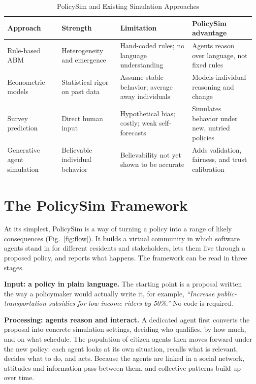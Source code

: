 \documentclass[conference]{IEEEtran}
\begin{document}
\begin{table}[!t]
\caption{PolicySim and Existing Simulation Approaches}
\label{tab:compare}
\centering
\renewcommand{\arraystretch}{1.25}
\footnotesize
\begin{tabular}{@{}p{1.2cm}p{1.55cm}p{1.65cm}p{1.9cm}@{}}
\toprule
\textbf{Approach} & \textbf{Strength} & \textbf{Limitation} & \textbf{PolicySim advantage} \\
\midrule
Rule-based ABM & Heterogeneity and emergence & Hand-coded rules; no language understanding & Agents reason over language, not fixed rules \\
Econometric models & Statistical rigor on past data & Assume stable behavior; average away individuals & Models individual reasoning and change \\
Survey prediction & Direct human input & Hypothetical bias; costly; weak self-forecasts & Simulates behavior under new, untried policies \\
Generative agent simulation & Believable individual behavior & Believability not yet shown to be accurate & Adds validation, fairness, and trust calibration \\
\bottomrule
\end{tabular}
\end{table}

\section{The PolicySim Framework}

At its simplest, PolicySim is a way of turning a policy into a range of likely consequences (Fig.~\ref{fig:flow}). It builds a virtual community in which software agents stand in for different residents and stakeholders, lets them live through a proposed policy, and reports what happens. The framework can be read in three stages.

\textbf{Input: a policy in plain language.} The starting point is a proposal written the way a policymaker would actually write it, for example, \emph{``Increase public-transportation subsidies for low-income riders by 50\%.''} No code is required.

\textbf{Processing: agents reason and interact.} A dedicated agent first converts the proposal into concrete simulation settings, deciding who qualifies, by how much, and on what schedule. The population of citizen agents then moves forward under the new policy: each agent looks at its own situation, recalls what is relevant, decides what to do, and acts. Because the agents are linked in a social network, attitudes and information pass between them, and collective patterns build up over time.
\end{document}
